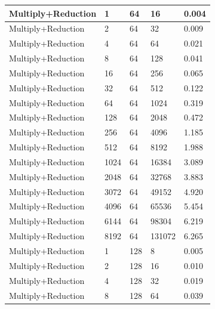 \documentclass{article}
\begin{document}
\begin{longtable}{|l|l|l|l|l|}
Multiply+Reduction & 1    & 64          & 16                & 0.004             \\ \hline
Multiply+Reduction & 2    & 64          & 32                & 0.009             \\ \hline
Multiply+Reduction & 4    & 64          & 64                & 0.021             \\ \hline
Multiply+Reduction & 8    & 64          & 128               & 0.041             \\ \hline
Multiply+Reduction & 16   & 64          & 256               & 0.065             \\ \hline
Multiply+Reduction & 32   & 64          & 512               & 0.122             \\ \hline
Multiply+Reduction & 64   & 64          & 1024              & 0.319             \\ \hline
Multiply+Reduction & 128  & 64          & 2048              & 0.472             \\ \hline
Multiply+Reduction & 256  & 64          & 4096              & 1.185             \\ \hline
Multiply+Reduction & 512  & 64          & 8192              & 1.988             \\ \hline
Multiply+Reduction & 1024 & 64          & 16384             & 3.089             \\ \hline
Multiply+Reduction & 2048 & 64          & 32768             & 3.883             \\ \hline
Multiply+Reduction & 3072 & 64          & 49152             & 4.920             \\ \hline
Multiply+Reduction & 4096 & 64          & 65536             & 5.454             \\ \hline
Multiply+Reduction & 6144 & 64          & 98304             & 6.219             \\ \hline
Multiply+Reduction & 8192 & 64          & 131072            & 6.265             \\ \hline
Multiply+Reduction & 1    & 128         & 8                 & 0.005             \\ \hline
Multiply+Reduction & 2    & 128         & 16                & 0.010             \\ \hline
Multiply+Reduction & 4    & 128         & 32                & 0.019             \\ \hline
Multiply+Reduction & 8    & 128         & 64                & 0.039             \\ \hline

\end{longtable}
\end{document}
